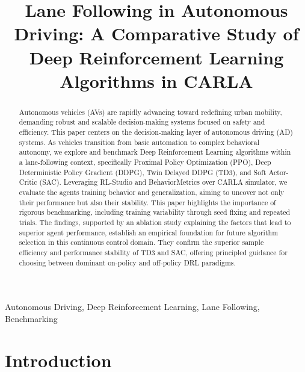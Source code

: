 \documentclass[]{interact}
\begin{document}

\title{Lane Following in Autonomous Driving: A Comparative Study of Deep Reinforcement Learning Algorithms in CARLA}

\author{
}

\maketitle

\begin{abstract} 
Autonomous vehicles (AVs) are rapidly advancing toward redefining urban mobility, demanding robust and scalable decision-making systems focused on safety and efficiency. This paper centers on the decision-making layer of autonomous driving (AD) systems. As vehicles transition from basic automation to complex behavioral autonomy, we explore and benchmark Deep Reinforcement Learning algorithms within a lane-following context, specifically Proximal Policy Optimization (PPO), Deep Deterministic Policy Gradient (DDPG), Twin Delayed DDPG (TD3), and Soft Actor-Critic (SAC). Leveraging RL-Studio and BehaviorMetrics over CARLA simulator, we evaluate the agents training behavior and generalization, aiming to uncover not only their performance but also their stability. This paper highlights the importance of rigorous benchmarking, including training variability through seed fixing and repeated trials. The findings, supported by an ablation study explaining the factors that lead to superior agent performance, establish an empirical foundation for future algorithm selection in this continuous control domain. They confirm the superior sample efficiency and performance stability of TD3 and SAC, offering principled guidance for choosing between dominant on-policy and off-policy DRL paradigms.
\end{abstract}

\begin{keywords}
Autonomous Driving,
Deep Reinforcement Learning,
Lane Following,
Benchmarking
\end{keywords}

\section{Introduction} 
\end{document}

